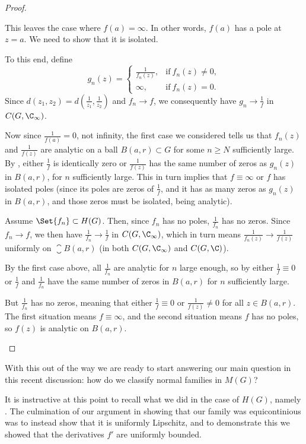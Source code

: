 \begin{proof}
\begin{items}
		This leaves the case where $f(a) = \infty$.
		In other words, $f(a)$ has a pole at $z = a$.
		We need to show that it is isolated.

		To this end, define
		\[
			g_n(z) = \begin{cases}
				\frac{1}{f_n(z)}, & \text{if}~ f_n(z) \neq 0, \\
				\infty, & \text{if}~ f_n(z) = 0.
			\end{cases}
		\]
		Since $d(z_1, z_2) = d(\frac{1}{z_1}, \frac{1}{z_2})$ and $f_n \to f$, we consequently have $g_n \to \frac{1}{f}$ in $C(G, \C_\infty)$.

		Now since $\frac{1}{f(a)} = 0$, not infinity, the first case we considered tells us that $f_n(z)$ and $\frac{1}{f(z)}$ are analytic on a ball $B(a, r) \subset G$ for some $n \geq N$ sufficiently large.
		By , either $\frac{1}{f}$ is identically zero or $\frac{1}{f(z)}$ has the same number of zeros as $g_n(z)$ in $B(a, r)$, for $n$ sufficiently large.
		This in turn implies that $f \equiv \infty$ or $f$ has isolated poles (since its poles are zeros of $\frac{1}{f}$, and it has as many zeros as $g_n(z)$ in $B(a, r)$, and those zeros must be isolated, being analytic).

		\item Assume $\Set{f_n} \subset H(G)$.
		Then, since $f_n$ has no poles, $\frac{1}{f_n}$ has no zeros.
		Since $f_n \to f$, we then have $\frac{1}{f_n} \to \frac{1}{f}$ in $C(G, \C_\infty)$, which in turn means $\frac{1}{f_n(z)} \to \frac{1}{f(z)}$ uniformly on $\closure{B(a, r)}$ (in both $C(G, \C_\infty)$ and $C(G, \C)$).

		By the first case above, all $\frac{1}{f_n}$ are analytic for $n$ large enough, so by  either $\frac{1}{f} \equiv 0$ or $\frac{1}{f}$ and $\frac{1}{f_n}$ have the same number of zeros in $B(a, r)$ for $n$ sufficiently large.

		But $\frac{1}{f_n}$ has no zeros, meaning that either $\frac{1}{f} \equiv 0$ or $\frac{1}{f(z)} \neq 0$ for all $z \in B(a, r)$.
		The first situation means $f \equiv \infty$, and the second situation means $f$ has no poles, so $f(z)$ is analytic on $B(a, r)$. \qedhere
	\end{items}
\end{proof}

With this out of the way we are ready to start answering our main question in this recent discussion: how do we classify normal families in $M(G)$?

It is instructive at this point to recall what we did in the case of $H(G)$, namely .
The culmination of our argument in showing that our family was equicontinious was to instead show that it is uniformly Lipschitz, and to demonstrate this we showed that the derivatives $f'$ are uniformly bounded.

